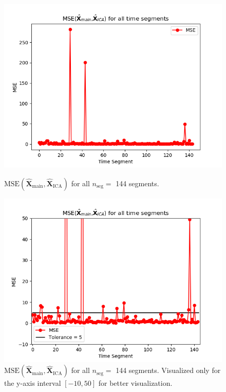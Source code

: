 \begin{figure}[H]
\begin{widepage}
    \begin{minipage}[t]{.45\textwidth}
		\centering
		\includegraphics[width=1\linewidth]{figures/ch_7/resultat/average_mse_none_removed_ica}
	\caption{$\text{MSE} \left(\hat{\mathbf{X}}_{\text{main}}, \hat{\mathbf{X}}_{\text{ICA}}\right)$ for all $n_{\text{seg}} = $ 144 segments.}
	\label{fig:M=N_1}
    \end{minipage} 
    \hspace{0.5cm}
    \begin{minipage}[t]{.45\textwidth}
        \centering
		\includegraphics[width=1\linewidth]{figures/ch_7/resultat/average_mse_none_removed_ica_zoom.png}
	\caption{$\text{MSE} \left(\hat{\mathbf{X}}_{\text{main}}, \hat{\mathbf{X}}_{\text{ICA}}\right)$ for all $n_{\text{seg}} = $ 144 segments. Visualized only for the y-axis interval $[-10, 50]$ for better visualization.}
	\label{fig:M=N_1_2}
    \end{minipage}
\end{widepage}
\end{figure}
